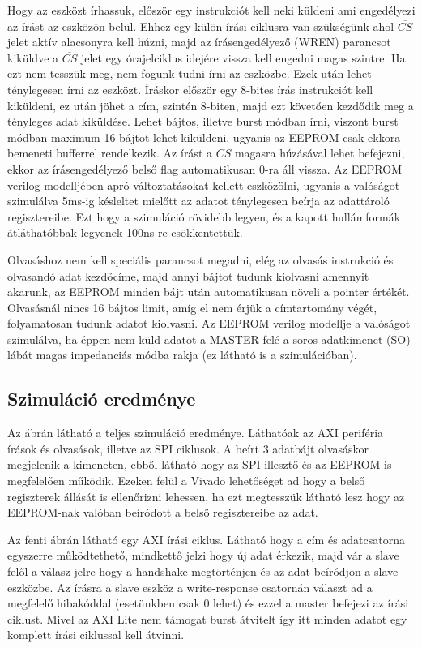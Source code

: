 \documentclass[a4paper,11pt]{article}
\begin{document}
Hogy az eszközt írhassuk, először egy instrukciót kell neki küldeni ami engedélyezi az írást az eszközön belül. Ehhez egy külön írási ciklusra van szükségünk ahol $\overline{CS}$ jelet aktív alacsonyra kell húzni, majd az írásengedélyező (WREN) parancsot kiküldve a $\overline{CS}$ jelet egy órajelciklus idejére vissza kell engedni magas szintre. Ha ezt nem tesszük meg, nem fogunk tudni írni az eszközbe. Ezek után lehet ténylegesen írni az eszközt. Íráskor először egy 8-bites írás instrukciót kell kiküldeni, ez után jöhet a cím, szintén 8-biten, majd ezt követően kezdődik meg a tényleges adat kiküldése. Lehet bájtos, illetve burst módban írni, viszont burst módban maximum 16 bájtot lehet kiküldeni, ugyanis az EEPROM csak ekkora bemeneti bufferrel rendelkezik. Az írást a $\overline{CS}$ magasra húzásával lehet befejezni, ekkor az írásengedélyező belső flag automatikusan 0-ra áll vissza. Az EEPROM verilog modelljében apró változtatásokat kellett eszközölni, ugyanis a valóságot szimulálva 5ms-ig késleltet mielőtt az adatot ténylegesen beírja az adattároló regisztereibe. Ezt hogy a szimuláció rövidebb legyen, és a kapott hullámformák átláthatóbbak legyenek 100ns-re csökkentettük.

Olvasáshoz nem kell speciális parancsot megadni, elég az olvasás instrukció és olvasandó adat kezdőcíme, majd annyi bájtot tudunk kiolvasni amennyit akarunk, az EEPROM minden bájt után automatikusan növeli a pointer értékét. Olvasásnál nincs 16 bájtos limit, amíg el nem érjük a címtartomány végét, folyamatosan tudunk adatot kiolvasni. Az EEPROM verilog modellje a valóságot szimulálva, ha éppen nem küld adatot a MASTER felé a soros adatkimenet (SO) lábát magas impedanciás módba rakja (ez látható is a szimulációban).

\subsection{Szimuláció eredménye}
Az ábrán látható a teljes szimuláció eredménye. Láthatóak az AXI periféria írások és olvasások, illetve az SPI ciklusok. A beírt 3 adatbájt olvasáskor megjelenik a kimeneten, ebből látható hogy az SPI illesztő és az EEPROM is megfelelően működik. Ezeken felül a Vivado lehetőséget ad hogy a belső regiszterek állását is ellenőrizni lehessen, ha ezt megtesszük látható lesz hogy az EEPROM-nak valóban beíródott a belső regisztereibe az adat.


Az fenti ábrán látható egy AXI írási ciklus. Látható hogy a cím és adatcsatorna egyszerre működtethető, mindkettő jelzi hogy új adat érkezik, majd vár a slave felől a válasz jelre hogy a handshake megtörténjen és az adat beíródjon a slave eszközbe. Az írásra a slave eszköz a write-response csatornán választ ad a megfelelő hibakóddal (esetünkben csak 0 lehet) és ezzel a master befejezi az írási ciklust. Mivel az AXI Lite nem támogat burst átvitelt így itt minden adatot egy komplett írási ciklussal kell átvinni.
\end{document}
